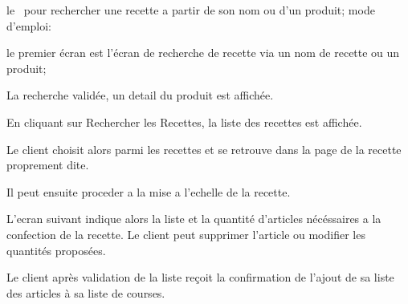 \item le \cu\ \from[CHREC] pour rechercher une recette a partir de son nom ou d'un produit; mode d'emploi:
    \startitemize[n]
\item le premier écran est l'écran de recherche de recette via un nom de recette ou un produit;
\item La recherche validée, un detail du produit est affichée.
\item En cliquant sur Rechercher les Recettes, la liste des recettes est affichée.
\item Le client choisit alors parmi les recettes et se retrouve dans la page de la recette proprement dite.
\item Il peut ensuite proceder a la mise a l'echelle de la recette.
\item L'ecran suivant indique alors la liste et la quantité d'articles nécéssaires a la confection de la recette. Le client peut supprimer l'article ou modifier les quantités proposées.
\item Le client après validation de la liste reçoit la confirmation de l'ajout de sa liste des articles à sa liste de courses.
    \stopitemize
\stopitemize
